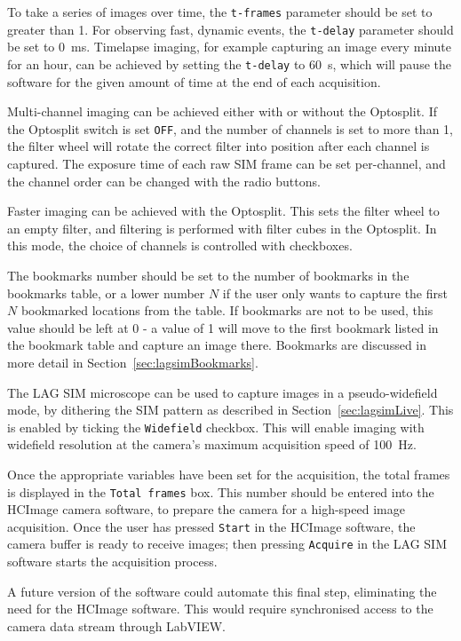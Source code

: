 To take a series of images over time, the \texttt{t-frames} parameter should be set to greater than 1.
For observing fast, dynamic events, the \texttt{t-delay} parameter should be set to \SI{0}{\milli\second}.
Timelapse imaging, for example capturing an image every minute for an hour, can be achieved by setting the \texttt{t-delay} to \SI{60}{\second}, which will pause the software for the given amount of time at the end of each acquisition.

Multi-channel imaging can be achieved either with or without the Optosplit.
If the Optosplit switch is set \texttt{OFF}, and the number of channels is set to more than 1, the filter wheel will rotate the correct filter into position after each channel is captured.
The exposure time of each raw SIM frame can be set per-channel, and the channel order can be changed with the radio buttons.

Faster imaging can be achieved with the Optosplit.
This sets the filter wheel to an empty filter, and filtering is performed with filter cubes in the Optosplit.
In this mode, the choice of channels is controlled with checkboxes.

The bookmarks number should be set to the number of bookmarks in the bookmarks table, or a lower number $N$ if the user only wants to capture the first $N$ bookmarked locations from the table.
If bookmarks are not to be used, this value should be left at 0 - a value of 1 will move to the first bookmark listed in the bookmark table and capture an image there.
Bookmarks are discussed in more detail in Section~\ref{sec:lagsimBookmarks}.

The LAG SIM microscope can be used to capture images in a pseudo-widefield mode, by dithering the SIM pattern as described in Section~\ref{sec:lagsimLive}.
This is enabled by ticking the \texttt{Widefield} checkbox.
This will enable imaging with widefield resolution at the camera's maximum acquisition speed of \SI{100}{\hertz}.

Once the appropriate variables have been set for the acquisition, the total frames is displayed in the \texttt{Total frames} box.
This number should be entered into the HCImage camera software, to prepare the camera for a high-speed image acquisition.
Once the user has pressed \texttt{Start} in the HCImage software, the camera buffer is ready to receive images; then pressing \texttt{Acquire} in the LAG SIM software starts the acquisition process.

A future version of the software could automate this final step, eliminating the need for the HCImage software.
This would require synchronised access to the camera data stream through LabVIEW.


